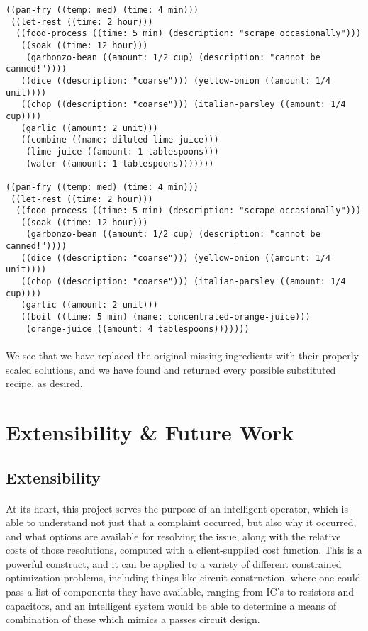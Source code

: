 \begin{verbatim}
((pan-fry ((temp: med) (time: 4 min)))
 ((let-rest ((time: 2 hour)))
  ((food-process ((time: 5 min) (description: "scrape occasionally")))
   ((soak ((time: 12 hour)))
    (garbonzo-bean ((amount: 1/2 cup) (description: "cannot be canned!"))))
   ((dice ((description: "coarse"))) (yellow-onion ((amount: 1/4 unit))))
   ((chop ((description: "coarse"))) (italian-parsley ((amount: 1/4 cup))))
   (garlic ((amount: 2 unit)))
   ((combine ((name: diluted-lime-juice)))
    (lime-juice ((amount: 1 tablespoons)))
    (water ((amount: 1 tablespoons)))))))

((pan-fry ((temp: med) (time: 4 min)))
 ((let-rest ((time: 2 hour)))
  ((food-process ((time: 5 min) (description: "scrape occasionally")))
   ((soak ((time: 12 hour)))
    (garbonzo-bean ((amount: 1/2 cup) (description: "cannot be canned!"))))
   ((dice ((description: "coarse"))) (yellow-onion ((amount: 1/4 unit))))
   ((chop ((description: "coarse"))) (italian-parsley ((amount: 1/4 cup))))
   (garlic ((amount: 2 unit)))
   ((boil ((time: 5 min) (name: concentrated-orange-juice)))
    (orange-juice ((amount: 4 tablespoons)))))))
\end{verbatim}

\paragraph{}
We see that we have replaced the original missing ingredients with their properly scaled solutions, and we have found and returned every possible substituted recipe, as desired.












\newpage
\section{Extensibility \& Future Work}
\subsection{Extensibility}
\paragraph{}
At its heart, this project serves the purpose of an intelligent  operator, which is able to understand not just that a complaint occurred, but also why it occurred, and what options are available for resolving the issue, along with the relative costs of those resolutions, computed with a client-supplied cost function. This is a powerful construct, and it can be applied to a variety of different constrained optimization problems, including things like circuit construction, where one could pass a list of components they have available, ranging from IC's to resistors and capacitors, and an intelligent system would be able to determine a means of combination of these which mimics a passes circuit design.

